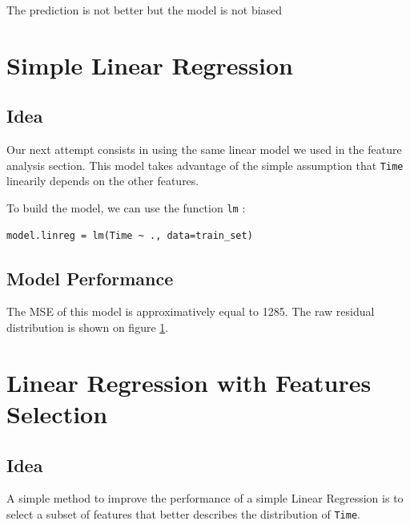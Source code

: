 \documentclass[]{report}
\begin{document}
The prediction is not better but the model is not biased

\section{Simple Linear Regression}
\subsection{Idea}
Our next attempt consists in using the same linear model we used in the feature analysis section. This model takes advantage of the simple assumption that \texttt{Time} linearily depends on the other features.

To build the model, we can use the function \texttt{lm} :
\begin{lstlisting}
model.linreg = lm(Time ~ ., data=train_set)
\end{lstlisting}


\subsection{Model Performance}
The MSE of this model is approximatively equal to 1285. The raw residual distribution is shown on figure \ref{fig:linreg_hist}. 

\begin{figure}[!h]
	\centering
	
	\caption{}
	\label{fig:linreg_hist}
\end{figure}

\section{Linear Regression with Features Selection}
\subsection{Idea}
A simple method to improve the performance of a simple Linear Regression is to select a subset of features that better describes the distribution of \texttt{Time}.
\end{document}
